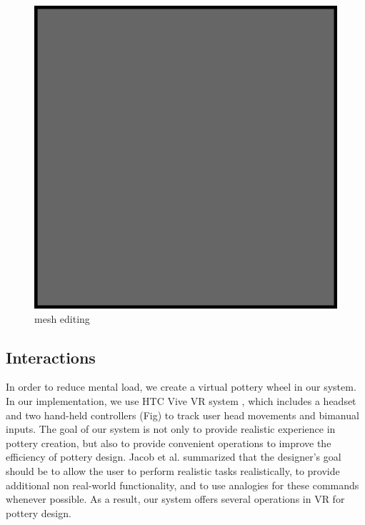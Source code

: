 \begin{figure}
  \includegraphics{example.eps}
\caption{mesh editing}
\label{fig:1}       %
\end{figure}

\subsection{Interactions}
\label{sec:4.3}

In order to reduce mental load, we create a virtual pottery wheel in our system.
In our implementation, we use HTC Vive VR system \cite{website:vive}, which includes a headset and two hand-held controllers (Fig) to track user head movements and bimanual inputs.
The goal of our system is not only to provide realistic experience in pottery creation, but also to provide convenient operations to improve the efficiency of pottery design. 
Jacob et al. \cite{Jacob2008Reality} summarized that the designer's goal should be to allow the user to perform realistic tasks realistically, to provide additional non real-world functionality, and to use analogies for these commands whenever possible.
As a result, our system offers several operations in VR for pottery design.


